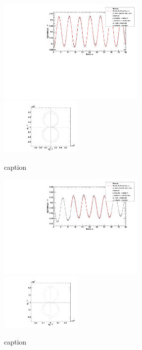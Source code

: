 \begin{figure}[H]
\begin{center}
  \includegraphics[width=0.64\textwidth]{../img/fit_Spule_R2.pdf}
  \includegraphics[width=0.35\textwidth]{../img/polar_Spule_R2.pdf}
  \caption{caption}
  \label{img:R2}
\end{center}
\end{figure}

\begin{figure}[H]
\begin{center}
  \includegraphics[width=0.64\textwidth]{../img/fit_Spule_R3.pdf}
  \includegraphics[width=0.35\textwidth]{../img/polar_Spule_R3.pdf}
  \caption{caption}
  \label{img:R3}
\end{center}
\end{figure}


